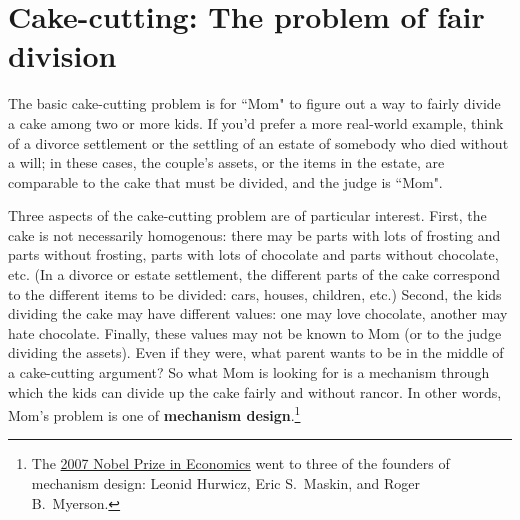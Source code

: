 

\section{Cake-cutting: The problem of fair division}

The basic cake-cutting problem is for ``Mom" to figure out a way to fairly divide a cake among two or more kids. If you'd prefer a more real-world example, think of a divorce settlement or the settling of an estate of somebody who died without a will; in these cases, the couple's assets, or the items in the estate, are comparable to the cake that must be divided, and the judge is ``Mom".

Three aspects of the cake-cutting problem are of particular interest. First, the cake is not necessarily homogenous: there may be parts with lots of frosting and parts without frosting, parts with lots of chocolate and parts without chocolate, etc. (In a divorce or estate settlement, the different parts of the cake correspond to the different items to be divided: cars, houses, children, etc.) Second, the kids dividing the cake may have different values: one may love chocolate, another may hate chocolate. Finally, these values may not be known to Mom (or to the judge dividing the assets). Even if they were, what parent wants to be in the middle of a  cake-cutting argument? So what Mom is looking for is a mechanism through which the kids can divide up the cake fairly and without rancor. In other words, Mom's problem is one of \textbf{mechanism design}.\footnote{The \href{http://nobelprize.org/nobel_prizes/economics/laureates/2007/}{2007 Nobel Prize in Economics} went to three of the founders of mechanism design: Leonid Hurwicz, Eric S.\ Maskin, and Roger B.\ Myerson.}


